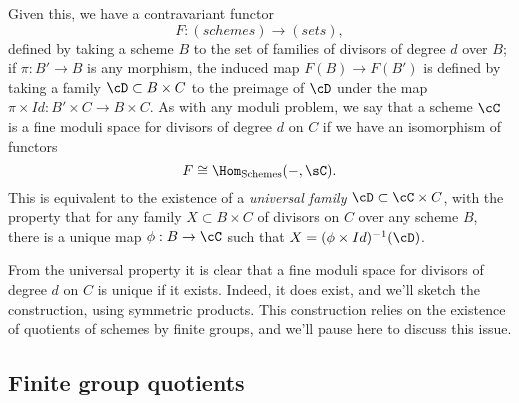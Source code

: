 Given this, we have a contravariant functor 
$$
F : (schemes) \to (sets),
$$
defined by taking a scheme $B$ to the set of families of divisors of degree $d$ over $B$; if $\pi : B' \to B$ is any morphism, the induced map $F(B) \to F(B')$ is defined by taking a family $\cD \subset B \times C$ to the preimage of $\cD$ under the map $\pi \times Id : B' \times C \to B \times C$. As with any moduli problem, we say that a scheme $\cC$ is a fine moduli space for divisors of degree $d$ on $C$ if we have an isomorphism of functors
$$
F \cong \Hom_{\rm{Schemes}}( -, \sC).
$$
This is equivalent to the existence of a \emph{universal family} $\cD \subset \cC \times C$, with the property that for any family $X \subset B \times C$ of divisors on $C$ over any scheme $B$, there is a unique map $\phi : B \to \cC$ such that $X = (\phi \times Id)^{-1}(\cD)$.

From the universal property it is clear that a fine moduli space for divisors of degree $d$ on $C$ is unique if it exists. Indeed, it does exist, and we'll sketch the construction, using symmetric products. This construction relies on the existence of quotients of schemes by finite groups, and we'll pause here to discuss this issue.


%
%

\subsection{Finite group quotients}


